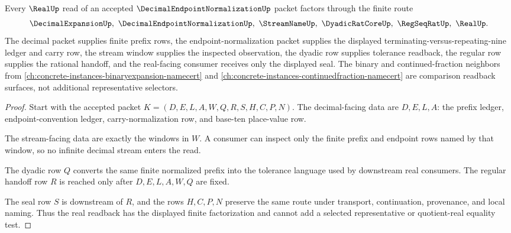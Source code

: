 \begin{theorem}\label{thm:decimal-endpoint-normalization-real-readback-boundary}
Every $\RealUp$ read of an accepted $\DecimalEndpointNormalizationUp$ packet factors through the finite route
$$
\DecimalExpansionUp,\ \DecimalEndpointNormalizationUp,\ \StreamNameUp,\ \DyadicRatCoreUp,\ \RegSeqRatUp,\ \RealUp .
$$
The decimal packet supplies finite prefix rows, the endpoint-normalization packet supplies the displayed terminating-versus-repeating-nine ledger and carry row, the stream window supplies the inspected observation, the dyadic row supplies tolerance readback, the regular row supplies the rational handoff, and the real-facing consumer receives only the displayed seal. The binary and continued-fraction neighbors from \autoref{ch:concrete-instances-binaryexpansion-namecert} and \autoref{ch:concrete-instances-continuedfraction-namecert} are comparison readback surfaces, not additional representative selectors.
\end{theorem}
\begin{proof}
Start with the accepted packet $K=(D,E,L,A,W,Q,R,S,H,C,P,N)$. The decimal-facing data are $D,E,L,A$: the prefix ledger, endpoint-convention ledger, carry-normalization row, and base-ten place-value row.

The stream-facing data are exactly the windows in $W$. A consumer can inspect only the finite prefix and endpoint rows named by that window, so no infinite decimal stream enters the read.

The dyadic row $Q$ converts the same finite normalized prefix into the tolerance language used by downstream real consumers. The regular handoff row $R$ is reached only after $D,E,L,A,W,Q$ are fixed.

The seal row $S$ is downstream of $R$, and the rows $H,C,P,N$ preserve the same route under transport, continuation, provenance, and local naming. Thus the real readback has the displayed finite factorization and cannot add a selected representative or quotient-real equality test.
\end{proof}

